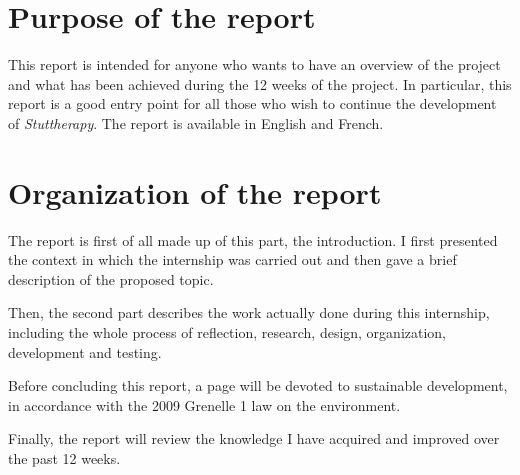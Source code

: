 \section{Purpose of the report}
This report is intended for anyone who wants to have an overview of the project and what has been achieved during the 12 weeks of the project. In particular, this report is a good entry point for all those who wish to continue the development of \textit{Stuttherapy}. The report is available in English and French.

\section{Organization of the report}

The report is first of all made up of this part, the introduction. I first presented the context in which the internship was carried out and then gave a brief description of the proposed topic.

Then, the second part describes the work actually done during this internship, including the whole process of reflection, research, design, organization, development and testing.

Before concluding this report, a page will be devoted to sustainable development, in accordance with the 2009 Grenelle 1 law on the environment.

Finally, the report will review the knowledge I have acquired and improved over the past 12 weeks. 























%
